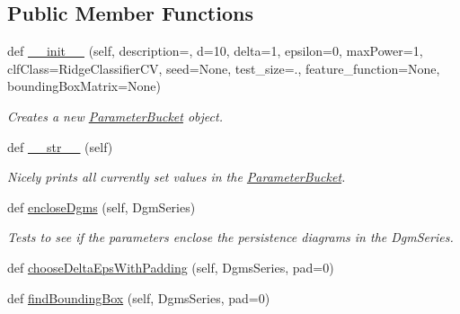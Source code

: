 \subsection*{Public Member Functions}
\begin{DoxyCompactItemize}
\item 
def \hyperlink{classteaspoon_1_1_m_l_1_1tents_1_1_parameter_bucket_a560cd613a020c1081f2ac0fa8caec4c5}{\+\_\+\+\_\+init\+\_\+\+\_\+} (self, description=\textquotesingle{}\textquotesingle{}, d=10, delta=1, epsilon=0, max\+Power=1, clf\+Class=Ridge\+Classifier\+CV, seed=None, test\+\_\+size=., feature\+\_\+function=None, bounding\+Box\+Matrix=None)
\begin{DoxyCompactList}\small\item\em Creates a new \hyperlink{classteaspoon_1_1_m_l_1_1tents_1_1_parameter_bucket}{Parameter\+Bucket} object. \end{DoxyCompactList}\item 
\mbox{\label{classteaspoon_1_1_m_l_1_1tents_1_1_parameter_bucket_a39e9d1148208dce4a8dec9354afb789d}} 
def \hyperlink{classteaspoon_1_1_m_l_1_1tents_1_1_parameter_bucket_a39e9d1148208dce4a8dec9354afb789d}{\+\_\+\+\_\+str\+\_\+\+\_\+} (self)
\begin{DoxyCompactList}\small\item\em Nicely prints all currently set values in the \hyperlink{classteaspoon_1_1_m_l_1_1tents_1_1_parameter_bucket}{Parameter\+Bucket}. \end{DoxyCompactList}\item 
def \hyperlink{classteaspoon_1_1_m_l_1_1tents_1_1_parameter_bucket_afbc1ce46c67e2a86a72d93cdcba558ea}{enclose\+Dgms} (self, Dgm\+Series)
\begin{DoxyCompactList}\small\item\em Tests to see if the parameters enclose the persistence diagrams in the Dgm\+Series. \end{DoxyCompactList}\item 
def \hyperlink{classteaspoon_1_1_m_l_1_1tents_1_1_parameter_bucket_a4dd95135123384b08f2e8fccd11e7d27}{choose\+Delta\+Eps\+With\+Padding} (self, Dgms\+Series, pad=0)
\item 
def \hyperlink{classteaspoon_1_1_m_l_1_1tents_1_1_parameter_bucket_a3fc98af840bf6f0f9f552e2e2f664fe8}{find\+Bounding\+Box} (self, Dgms\+Series, pad=0)
\end{DoxyCompactItemize}
